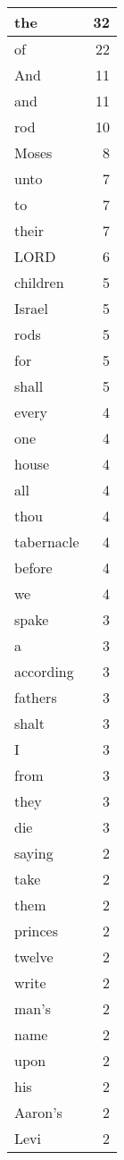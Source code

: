 \begin{center}
\begin{longtable}{l|r}
\hline \hline
\endlastfoot
the & 32 \\ \hline
of & 22 \\ \hline
And & 11 \\ \hline
and & 11 \\ \hline
rod & 10 \\ \hline
Moses & 8 \\ \hline
unto & 7 \\ \hline
to & 7 \\ \hline
their & 7 \\ \hline
LORD & 6 \\ \hline
children & 5 \\ \hline
Israel & 5 \\ \hline
rods & 5 \\ \hline
for & 5 \\ \hline
shall & 5 \\ \hline
every & 4 \\ \hline
one & 4 \\ \hline
house & 4 \\ \hline
all & 4 \\ \hline
thou & 4 \\ \hline
tabernacle & 4 \\ \hline
before & 4 \\ \hline
we & 4 \\ \hline
spake & 3 \\ \hline
a & 3 \\ \hline
according & 3 \\ \hline
fathers & 3 \\ \hline
shalt & 3 \\ \hline
I & 3 \\ \hline
from & 3 \\ \hline
they & 3 \\ \hline
die & 3 \\ \hline
saying & 2 \\ \hline
take & 2 \\ \hline
them & 2 \\ \hline
princes & 2 \\ \hline
twelve & 2 \\ \hline
write & 2 \\ \hline
man's & 2 \\ \hline
name & 2 \\ \hline
upon & 2 \\ \hline
his & 2 \\ \hline
Aaron's & 2 \\ \hline
Levi & 2 \\ \hline

\end{longtable}
\end{center}
